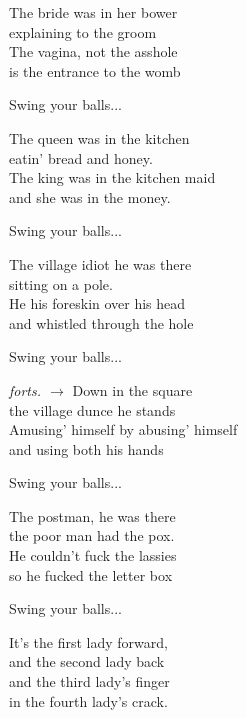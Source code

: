 \vspace{10pt}
The bride was in her bower\\
explaining to the groom\\
The vagina, not the asshole\\
is the entrance to the womb\par
\vspace{10pt}
Swing your balls...\par
\vspace{10pt}
The queen was in the kitchen\\
eatin' bread and honey.\\
The king was in the kitchen maid\\
and she was in the money.\par
\vspace{10pt}
Swing your balls...\par
\vspace{10pt}
The village idiot he was there\\
sitting on a pole.\\
He his foreskin over his head\\
and whistled through the hole\par
\vspace{10pt}
Swing your balls...\par
\vfill
\hfill {\footnotesize\textit{forts. $\rightarrow$}}
\newpage
Down in the square\\
the village dunce he stands\\
Amusing' himself by abusing' himself\\
and using both his hands\par
\vspace{10pt}
Swing your balls...\par
\vspace{10pt}
The postman, he was there\\
the poor man had the pox.\\
He couldn't fuck the lassies\\
so he fucked the letter box\par
\vspace{10pt}
Swing your balls...\par
\vspace{10pt}
It's the first lady forward,\\
and the second lady back\\
and the third lady's finger\\
in the fourth lady's crack.\par

